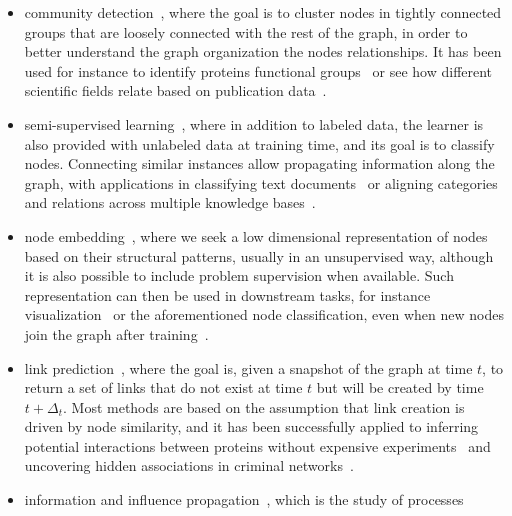 \begin{itemize}[nosep,leftmargin=*]
  \item community detection~\autocite{FortunatoSurvey10}, where the goal is to cluster nodes in
    tightly connected groups that are loosely connected with the rest of the graph, in order to
    better understand the graph organization the nodes relationships. It has been used for instance
    to identify proteins functional groups~\autocite{clusterBio03} or see how different scientific
    fields relate based on publication data~\autocite{clusterScience08}.
  \item semi-supervised learning~\autocites{SSL06}{graphSSL14}, where in addition to labeled data,
    the learner is also provided with unlabeled data at training time, and its goal is to classify
    nodes. Connecting similar instances
    allow propagating information along the graph, with applications in classifying text
    documents~\autocite{sslText09} or aligning categories and relations across multiple knowledge
    bases~\autocite{sslKB13}.
  \item node embedding~\autocite{representationLearning17}, where we seek a low dimensional
    representation of nodes based on their structural patterns, usually in an unsupervised way,
    although it is also possible to include problem supervision when available. Such representation can
    then be used in downstream tasks, for instance visualization~\autocite{LINE15} or the
    aforementioned node classification, even when new nodes join the graph after
    training~\autocite{inductiveRepresentation17}.
  \item link prediction~\autocite{linkPredSurvey16}, where the goal is, given a snapshot of the
    graph at time $t$, to return a set of links that do not exist at time $t$ but will be created by time
    $t+\Delta_t$. Most methods are based on the assumption that link creation is driven by node
    similarity, and it has been successfully applied to inferring potential interactions between
    proteins without expensive experiments~\autocite{linkPredBio06} and uncovering hidden
    associations in criminal networks~\autocite{linkPredCrime08}.
  \item information and influence propagation~\autocite{infmax13}, which is the study of processes

\end{itemize}
